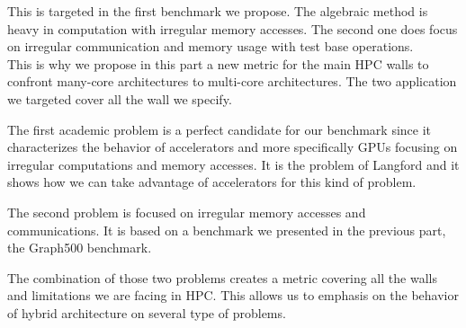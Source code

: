 This is targeted in the first benchmark we propose. 
The algebraic method is heavy in computation with irregular memory accesses. 
The second one does focus on irregular communication and memory usage with test base operations.\\

This is why we propose in this part a new metric for the main HPC walls to confront many-core architectures to multi-core architectures. 
The two application we targeted cover all the wall we specify. 

The first academic problem is a perfect candidate for our benchmark since it characterizes the behavior of accelerators and more specifically GPUs focusing on irregular computations and memory accesses. 
It is the problem of Langford and it shows how we can take advantage of accelerators for this kind of problem. 

The second problem is focused on irregular memory accesses and communications. 
It is based on a benchmark we presented in the previous part, the Graph500 benchmark.

The combination of those two problems creates a metric covering all the walls and limitations we are facing in HPC. 
This allows us to emphasis on the behavior of hybrid architecture on several type of problems.